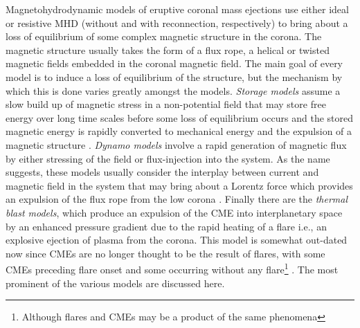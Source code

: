 Magnetohydrodynamic models of eruptive coronal mass ejections use either ideal or resistive MHD (without and with reconnection, respectively) to bring about a loss of equilibrium of some complex magnetic structure in the corona. The magnetic structure usually takes the form of a flux rope, a helical or twisted magnetic fields embedded in the coronal magnetic field. The main goal of every model is to induce a loss of equilibrium of the structure, but the mechanism by which this is done varies greatly amongst the models. {\it Storage models} assume a slow build up of magnetic stress in a non-potential field that may store free energy over long time scales before some loss of equilibrium occurs and the stored magnetic energy is rapidly converted to mechanical energy and the expulsion of a magnetic structure \citep{wolfson1998, forbes1995, antiochos1999}. {\it Dynamo models} involve a rapid generation of magnetic flux by either stressing of the field or flux-injection into the system. As the name suggests, these models usually consider the interplay between current and magnetic field in the system that may bring about a Lorentz force which provides an expulsion of the flux rope from the low corona \citep{chen1989, krall2001, schrijver2008, fan2005}. Finally there are the {\it thermal blast models}, which produce an expulsion of the CME into interplanetary space by an enhanced pressure gradient due to the rapid heating of a flare i.e., an explosive ejection of plasma from the corona.  This model is somewhat out-dated now since CMEs are no longer thought to be the result of flares, with some CMEs preceding flare onset and some occurring without any flare\footnote{{\color{blue}Although flares and CMEs may be a product of the same phenomena}} \citep{gosling1993}. The most prominent of the various models are discussed here.


